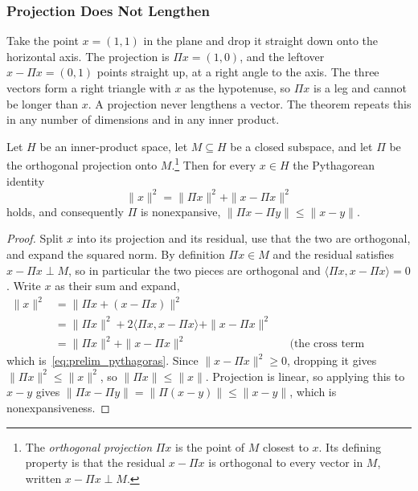 \subsubsection{Projection Does Not Lengthen}

Take the point $x = (1, 1)$ in the plane and drop it straight down onto the horizontal axis. The projection is $\Pi x = (1, 0)$, and the leftover $x - \Pi x = (0, 1)$ points straight up, at a right angle to the axis. The three vectors form a right triangle with $x$ as the hypotenuse, so $\Pi x$ is a leg and cannot be longer than $x$. A projection never lengthens a vector. The theorem repeats this in any number of dimensions and in any inner product.

\begin{theorem}
\label{thm:prelim_hilbert}
Let $H$ be an inner-product space, let $M \subseteq H$ be a closed subspace, and let $\Pi$ be the orthogonal projection onto $M$.\footnote{The \emph{orthogonal projection} $\Pi x$ is the point of $M$ closest to $x$. Its defining property is that the residual $x - \Pi x$ is orthogonal to every vector in $M$, written $x - \Pi x \perp M$.} Then for every $x \in H$ the Pythagorean identity
\begin{equation}
\|x\|^2 = \|\Pi x\|^2 + \|x - \Pi x\|^2
\label{eq:prelim_pythagoras}
\end{equation}
holds, and consequently $\Pi$ is nonexpansive, $\|\Pi x - \Pi y\| \leq \|x - y\|$.
\end{theorem}

\begin{proof}
Split $x$ into its projection and its residual, use that the two are orthogonal, and expand the squared norm. By definition $\Pi x \in M$ and the residual satisfies $x - \Pi x \perp M$, so in particular the two pieces are orthogonal and $\langle \Pi x, x - \Pi x \rangle = 0$. Write $x$ as their sum and expand,
\begin{align*}
\|x\|^2 &= \|\Pi x + (x - \Pi x)\|^2 \\
  &= \|\Pi x\|^2 + 2 \langle \Pi x, x - \Pi x \rangle + \|x - \Pi x\|^2 \\
  &= \|\Pi x\|^2 + \|x - \Pi x\|^2
     && \text{(the cross term vanishes),}
\end{align*}
which is~\eqref{eq:prelim_pythagoras}. Since $\|x - \Pi x\|^2 \geq 0$, dropping it gives $\|\Pi x\|^2 \leq \|x\|^2$, so $\|\Pi x\| \leq \|x\|$. Projection is linear, so applying this to $x - y$ gives $\|\Pi x - \Pi y\| = \|\Pi(x - y)\| \leq \|x - y\|$, which is nonexpansiveness.
\end{proof}

